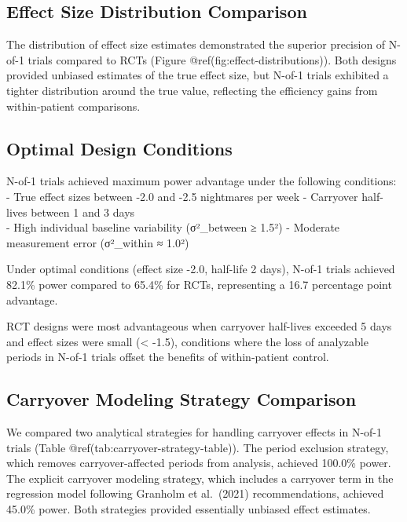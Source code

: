 \documentclass[
  11pt,
]{article}
\begin{document}
\subsection{Effect Size Distribution
Comparison}\label{effect-size-distribution-comparison}

The distribution of effect size estimates demonstrated the superior
precision of N-of-1 trials compared to RCTs (Figure
@ref(fig:effect-distributions)). Both designs provided unbiased
estimates of the true effect size, but N-of-1 trials exhibited a tighter
distribution around the true value, reflecting the efficiency gains from
within-patient comparisons.

\subsection{Optimal Design Conditions}\label{optimal-design-conditions}

N-of-1 trials achieved maximum power advantage under the following
conditions: - True effect sizes between -2.0 and -2.5 nightmares per
week - Carryover half-lives between 1 and 3 days\\
- High individual baseline variability (σ²\_between ≥ 1.5²) - Moderate
measurement error (σ²\_within ≈ 1.0²)

Under optimal conditions (effect size -2.0, half-life 2 days), N-of-1
trials achieved 82.1\% power compared to 65.4\% for RCTs, representing a
16.7 percentage point advantage.

RCT designs were most advantageous when carryover half-lives exceeded 5
days and effect sizes were small (\textless{} -1.5), conditions where
the loss of analyzable periods in N-of-1 trials offset the benefits of
within-patient control.

\subsection{Carryover Modeling Strategy
Comparison}\label{carryover-modeling-strategy-comparison}

We compared two analytical strategies for handling carryover effects in
N-of-1 trials (Table @ref(tab:carryover-strategy-table)). The period
exclusion strategy, which removes carryover-affected periods from
analysis, achieved 100.0\% power. The explicit carryover modeling
strategy, which includes a carryover term in the regression model
following Granholm et al.~(2021) recommendations, achieved 45.0\% power.
Both strategies provided essentially unbiased effect estimates.
\end{document}
